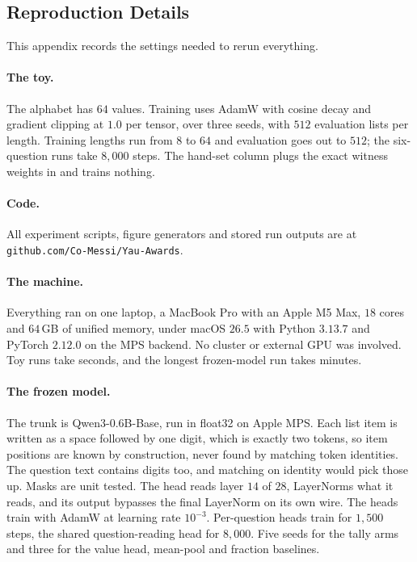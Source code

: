 \documentclass[10pt]{article}
\theoremstyle{definition}
\begin{document}
\begin{appendices}
\clearpage
\section{Reproduction Details}
\label{app:repro}

This appendix records the settings needed to rerun everything.

\paragraph{The toy.} The alphabet has $64$ values. Training uses AdamW with
cosine decay and gradient clipping at $1.0$ per tensor, over three seeds,
with $512$ evaluation lists per length. Training lengths run from $8$ to
$64$ and evaluation goes out to $512$; the six-question runs take $8{,}000$
steps. The hand-set column plugs the exact witness weights in and trains
nothing.

\paragraph{Code.} All experiment scripts, figure generators and stored
run outputs are at \texttt{github.com/Co-Messi/Yau-Awards}.

\paragraph{The machine.} Everything ran on one laptop, a MacBook Pro with
an Apple M5 Max, $18$ cores and $64$\,GB of unified memory, under macOS
$26.5$ with Python $3.13.7$ and PyTorch $2.12.0$ on the MPS backend. No
cluster or external GPU was involved. Toy runs take seconds, and the
longest frozen-model run takes minutes.

\paragraph{The frozen model.} The trunk is Qwen3-0.6B-Base, run in float32
on Apple MPS. Each
list item is written as a space followed by one digit, which is exactly two
tokens, so item positions are known by construction, never found by matching
token identities. The question text contains digits too, and matching on
identity would pick those up. Masks are unit tested. The head reads layer $14$ of $28$, LayerNorms what it
reads, and its output bypasses the final LayerNorm on its own wire. The
heads train with AdamW at learning rate $10^{-3}$. Per-question heads train for $1{,}500$ steps, the
shared question-reading head for $8{,}000$. Five seeds for the tally arms and
three for the value head, mean-pool and fraction baselines.


\end{appendices}
\end{document}
